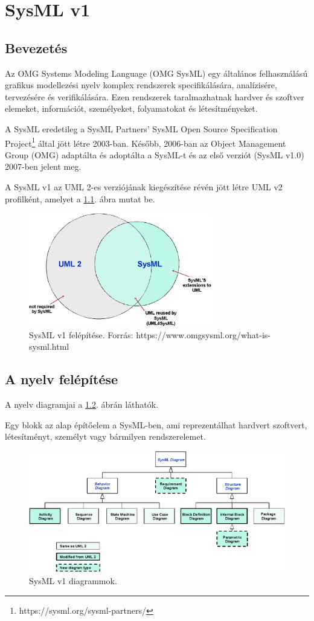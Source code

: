 \chapter{SysML v1}
\section{Bevezetés}
Az OMG Systems Modeling Language (OMG SysML) egy általános felhasználású grafikus modellezési nyelv komplex rendszerek specifikálására, analízisére, tervezésére és verifikálására.
Ezen rendszerek taralmazhatnak hardver és szoftver elemeket, információt, személyeket, folyamatokat és létesítményeket.

A SysML eredetileg a SysML Partners' SysML Open Source Specification Project\footnote{https://sysml.org/sysml-partners/} által jött létre 2003-ban.
Később, 2006-ban az Object Management Group (OMG) adaptálta és adoptálta a SysML-t és az első verziót (SysML v1.0) 2007-ben jelent meg.

A SysML v1 az UML 2-es verziójának kiegészítése révén jött létre UML v2 profilként, amelyet a \ref*{fig:sysv1_uml}. ábra mutat be.

\begin{figure}
    \centering
    \includegraphics[width=80mm,keepaspectratio]{figures/SysmlV1_Figure-1-a.jpg}
    \caption{SysML v1 felépítése. Forrás: https://www.omgsysml.org/what-is-sysml.html}
    \label{fig:sysv1_uml}
\end{figure}

\section{A nyelv felépítése}
A nyelv diagramjai a \ref*{fig:sysv1_diag}. ábrán láthatók.

Egy blokk az alap építőelem a SysML-ben, ami reprezentálhat hardvert szoftvert, létesítményt, személyt vagy bármilyen rendszerelemet.

\begin{figure}
    \centering
    \includegraphics[width=150mm, keepaspectratio]{figures/SysmlV1_diag.jpg}
    \caption{SysML v1 diagrammok.}
    \label{fig:sysv1_diag}
\end{figure}